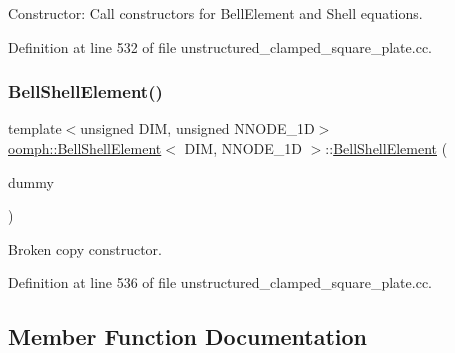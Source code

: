 Constructor\+: Call constructors for Bell\+Element and Shell equations. 



Definition at line 532 of file unstructured\+\_\+clamped\+\_\+square\+\_\+plate.\+cc.

\mbox{\label{classoomph_1_1BellShellElement_a9a3476e77088236068b559a7021a899d}} 
\subsubsection{\texorpdfstring{Bell\+Shell\+Element()}{BellShellElement()}\hspace{0.1cm}{\footnotesize\ttfamily [2/2]}}
{\footnotesize\ttfamily template$<$unsigned D\+IM, unsigned N\+N\+O\+D\+E\+\_\+1D$>$ \\
\hyperlink{classoomph_1_1BellShellElement}{oomph\+::\+Bell\+Shell\+Element}$<$ D\+IM, N\+N\+O\+D\+E\+\_\+1D $>$\+::\hyperlink{classoomph_1_1BellShellElement}{Bell\+Shell\+Element} (\begin{DoxyParamCaption}\item[{const \hyperlink{classoomph_1_1BellShellElement}{Bell\+Shell\+Element}$<$ D\+IM, N\+N\+O\+D\+E\+\_\+1D $>$ \&}]{dummy }\end{DoxyParamCaption})\hspace{0.3cm}{\ttfamily [inline]}}



Broken copy constructor. 



Definition at line 536 of file unstructured\+\_\+clamped\+\_\+square\+\_\+plate.\+cc.



\subsection{Member Function Documentation}
\mbox{\label{classoomph_1_1BellShellElement_a00932feabc5283a7edbff0cf8c52eb67}} 
